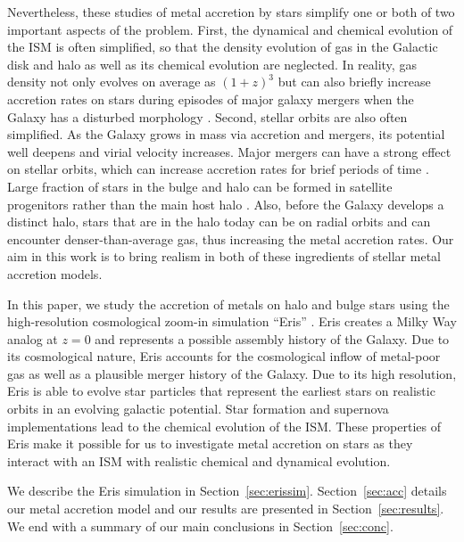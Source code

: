 \documentclass[a4paper,fleqn,usenatbib]{mnras}
\begin{document}
Nevertheless, these studies of metal accretion by stars simplify one
or both of two important aspects of the problem.  First, the dynamical
and chemical evolution of the ISM is often simplified, so that the
density evolution \citep{2013ApJ...773...43B} of gas in the Galactic
disk and halo as well as its chemical evolution
\citep{2011ApJ...729...16K, 2012ApJ...760...50S, 2013ApJ...772...93K,
  2013ApJ...765...89S, 2015ApJ...807..115S} are  neglected.  In
reality, gas density not only evolves on average as $(1+z)^3$ but can
also briefly increase accretion rates on stars during episodes of
major galaxy mergers when the Galaxy has a disturbed morphology
\citep{2013ApJ...773...43B}.  Second, stellar orbits are also often
simplified.  As the Galaxy grows in mass via accretion and mergers,
its potential well deepens and virial velocity increases.  Major
mergers can have a strong effect on stellar orbits, which can increase
accretion rates for brief periods of time \citep{2013ApJ...773...43B}.
Large fraction of stars in the bulge and halo can be formed in
satellite progenitors rather than the main host halo
\citep{2015ApJ...799..184P}.  Also, before the Galaxy develops a
distinct halo, stars that are in the halo today can be on radial
orbits and can encounter denser-than-average gas, thus increasing the
metal accretion rates.  Our aim in this work is to bring realism in
both of these ingredients of stellar metal accretion models.

In this paper, we study the accretion of metals on halo and bulge
stars using the high-resolution cosmological zoom-in simulation
``Eris'' \citep{Guedes11}.  Eris creates a Milky Way analog at $z=0$
and represents a possible assembly history of the Galaxy.  Due to its
cosmological nature, Eris accounts for the cosmological inflow of
metal-poor gas as well as a plausible merger history of the Galaxy.
Due to its high resolution, Eris is able to evolve star particles that
represent the earliest stars on realistic orbits in an evolving
galactic potential.  Star formation and supernova implementations lead
to the chemical evolution of the ISM.  These properties of Eris make
it possible for us to investigate metal accretion on stars as they
interact with an ISM with realistic chemical and dynamical evolution.

We describe the Eris simulation in Section~\ref{sec:erissim}.
Section~\ref{sec:acc} details our metal accretion model and our
results are presented in Section~\ref{sec:results}.  We end with a
summary of our main conclusions in Section~\ref{sec:conc}.
\end{document}
